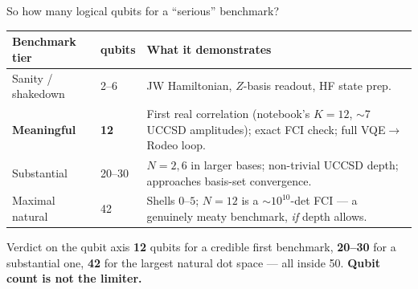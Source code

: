 \documentclass[aspectratio=169,11pt]{beamer}
\begin{document}
\begin{frame}{So how many logical qubits for a ``serious'' benchmark?}
\renewcommand{\arraystretch}{1.3}
\begin{center}\small
\begin{tabular}{@{}p{3.2cm}p{2.2cm}p{6.4cm}@{}}
\toprule
\textbf{Benchmark tier} & \textbf{qubits} & \textbf{What it demonstrates} \\
\midrule
Sanity / shakedown & 2--6 & JW Hamiltonian, $Z$-basis readout, HF state prep. \\
\textbf{Meaningful} & \textbf{12} & First real correlation (notebook's $K{=}12$,
   $\sim$7 UCCSD amplitudes); exact FCI check; full VQE$\to$Rodeo loop. \\
Substantial & 20--30 & $N{=}2,6$ in larger bases; non-trivial UCCSD depth;
   approaches basis-set convergence. \\
Maximal natural & 42 & Shells $0$--$5$; $N{=}12$ is a $\sim\!10^{10}$-det FCI ---
   a genuinely meaty benchmark, \emph{if} depth allows. \\
\bottomrule
\end{tabular}
\end{center}
\vspace{2pt}
\begin{block}{Verdict on the qubit axis}
\textbf{12} qubits for a credible first benchmark, \textbf{20--30} for a substantial one,
\textbf{42} for the largest natural dot space --- all inside 50.
\textbf{Qubit count is not the limiter.}
\end{block}
\end{frame}
\end{document}
